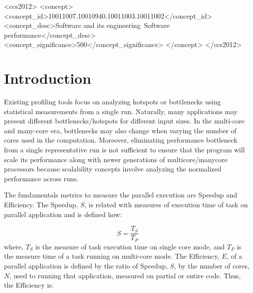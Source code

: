 \documentclass[sigconf]{acmart}
\begin{document}
%
%
\begin{CCSXML}
<ccs2012>
<concept>
<concept_id>10011007.10010940.10011003.10011002</concept_id>
<concept_desc>Software and its engineering~Software performance</concept_desc>
<concept_significance>500</concept_significance>
</concept>
</ccs2012>
\end{CCSXML}



\maketitle

\section{Introduction}
Existing profiling tools focus on analyzing hotspots or bottlenecks using statistical measurements from a single run. Naturally, many applications may present different bottlenecks/hotspots for different input sizes. In the multi-core and many-core era, bottlenecks may also change when varying the number of cores used in the computation. Moreover, eliminating performance bottleneck from a single representative run is not sufficient to ensure that the program will scale its performance along with newer generations of multicore/manycore processors because scalability concepts involve analyzing the normalized performance across runs. 

The fundamentals metrics to measure the parallel execution are Speedup and Efficiency. The Speedup, $S$, is related with measures of execution time of task on parallel application and is defined how:

\begin{equation}
  S = \frac{T_{S}}{T_{P}}
  \label{eq:speedup}
\end{equation}
where, $T_{S}$ is the measure of task execution time on single core mode, and $T_{P}$ is the measure time of a task running on multi-core mode. The Efficiency, $E$, of a parallel application is defined by the ratio of Speedup, $S$, by  the number of cores, $N$, used to running that application, measured on partial or entire code. Thus, the Efficiency is:
\end{document}
